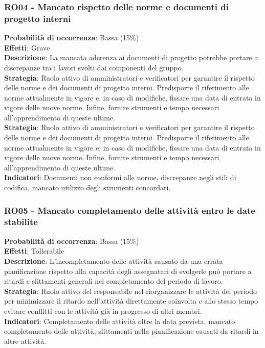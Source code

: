 \documentclass[a4paper,12pt]{article}
\begin{document}
\subsubsection{RO04 - Mancato rispetto delle norme e documenti di progetto interni}
\label{RO04}
\textbf{Probabilità di occorrenza}: Bassa (15\%)\\
\textbf{Effetti}: Grave\\
\textbf{Descrizione}: La mancata aderenza ai documenti di progetto potrebbe portare a discrepanze tra i lavori svolti dai componenti del gruppo.\\
\textbf{Strategia}: Ruolo attivo di amministratori e verificatori per garantire il rispetto delle norme e dei documenti di progetto interni. Predisporre il riferimento alle norme attualmente in vigore e, in caso di modifiche, fissare una data di entrata in vigore delle nuove norme. Infine, fornire strumenti e tempo necessari all'apprendimento di queste ultime.\\
\textbf{Strategia}: Ruolo attivo di amministratori e verificatori per garantire il rispetto delle norme e dei documenti di progetto interni. Predisporre il riferimento alle norme attualmente in vigore e, in caso di modifiche, fissare una data di entrata in vigore delle nuove norme. Infine, fornire strumenti e tempo necessari all'apprendimento di queste ultime.\\
\textbf{Indicatori}: Documenti non conformi alle norme, discrepanze negli stili di codifica, mancato utilizzo degli strumenti concordati.

\subsubsection{RO05 - Mancato completamento delle attività entro le date stabilite}
\label{RO05}
\textbf{Probabilità di occorrenza}: Bassa (15\%)\\
\textbf{Effetti}: Tollerabile\\
\textbf{Descrizione}: L'incompletamento delle attività causato da una errata pianificazione rispetto alla capacità degli assegnatari di svolgerle può portare a ritardi e slittamenti generali nel completamento del periodo di lavoro.\\
\textbf{Strategia}: Ruolo attivo del responsabile nel riorganizzare le attività del periodo per minimizzare il ritardo nell'attività direttamente coinvolta e allo stesso tempo evitare conflitti con le attività già in progresso di altri membri.\\
\textbf{Indicatori}: Completamento delle attività oltre la data prevista, mancato completamento delle attività, slittamenti nella pianificazione causati da ritardi in altre attività.
\end{document}
